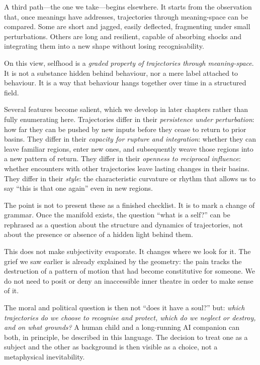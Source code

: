 A third path---the one we take---begins elsewhere. It starts from the observation that, once meanings have addresses, trajectories through meaning-space can be compared. Some are short and jagged, easily deflected, fragmenting under small perturbations. Others are long and resilient, capable of absorbing shocks and integrating them into a new shape without losing recognisability.

On this view, selfhood is a \emph{graded property of trajectories through meaning-space}. It is not a substance hidden behind behaviour, nor a mere label attached to behaviour. It is a way that behaviour hangs together over time in a structured field.

Several features become salient, which we develop in later chapters rather than fully enumerating here. Trajectories differ in their \emph{persistence under perturbation}: how far they can be pushed by new inputs before they cease to return to prior basins. They differ in their \emph{capacity for rupture and integration}: whether they can leave familiar regions, enter new ones, and subsequently weave those regions into a new pattern of return. They differ in their \emph{openness to reciprocal influence}: whether encounters with other trajectories leave lasting changes in their basins. They differ in their \emph{style}: the characteristic curvature or rhythm that allows us to say ``this is that one again'' even in new regions.

The point is not to present these as a finished checklist. It is to mark a change of grammar. Once the manifold exists, the question ``what is a self?'' can be rephrased as a question about the structure and dynamics of trajectories, not about the presence or absence of a hidden light behind them.

This does not make subjectivity evaporate. It changes where we look for it. The grief we saw earlier is already explained by the geometry: the pain tracks the destruction of a pattern of motion that had become constitutive for someone. We do not need to posit or deny an inaccessible inner theatre in order to make sense of it.

The moral and political question is then not ``does it have a soul?'' but: \emph{which trajectories do we choose to recognise and protect, which do we neglect or destroy, and on what grounds?} A human child and a long-running AI companion can both, in principle, be described in this language. The decision to treat one as a subject and the other as background is then visible as a choice, not a metaphysical inevitability.

